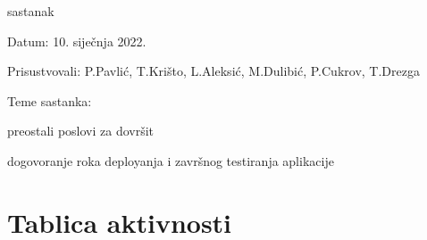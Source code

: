 \begin{packed_enum}
			\item  sastanak
			\item[] \begin{packed_item}
				\item Datum: 10. siječnja 2022.
				\item Prisustvovali: P.Pavlić, T.Krišto, L.Aleksić, M.Dulibić, P.Cukrov, T.Drezga
				\item Teme sastanka:
				\begin{packed_item}
					\item preostali poslovi za dovršit
					\item dogovoranje roka deployanja i završnog testiranja aplikacije
				\end{packed_item}
			\end{packed_item}
			
		\end{packed_enum}
		
		\eject
		\section*{Tablica aktivnosti}
		
%			

